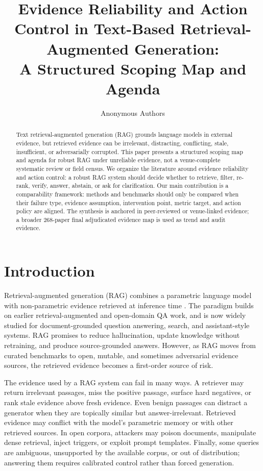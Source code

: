 \documentclass[11pt]{article}
\title{Evidence Reliability and Action Control in Text-Based Retrieval-Augmented Generation:\\
A Structured Scoping Map and Agenda}
\author{Anonymous Authors}
\date{}
\begin{document}
\maketitle

\begin{abstract}
Text retrieval-augmented generation (RAG) grounds language models in external evidence, but retrieved evidence can be irrelevant, distracting, conflicting, stale, insufficient, or adversarially corrupted. This paper presents a structured scoping map and agenda for robust RAG under unreliable evidence, not a venue-complete systematic review or field census. We organize the literature around evidence reliability and action control: a robust RAG system should decide whether to retrieve, filter, re-rank, verify, answer, abstain, or ask for clarification. Our main contribution is a comparability framework: methods and benchmarks should only be compared when their failure type, evidence assumption, intervention point, metric target, and action policy are aligned. The synthesis is anchored in peer-reviewed or venue-linked evidence; a broader 268-paper final adjudicated evidence map is used as trend and audit evidence.
\end{abstract}

\section{Introduction}

Retrieval-augmented generation (RAG) combines a parametric language model with non-parametric evidence retrieved at inference time \citep{lewis2020rag}. The paradigm builds on earlier retrieval-augmented and open-domain QA work, and is now widely studied for document-grounded question answering, search, and assistant-style systems. RAG promises to reduce hallucination, update knowledge without retraining, and produce source-grounded answers. However, as RAG moves from curated benchmarks to open, mutable, and sometimes adversarial evidence sources, the retrieved evidence becomes a first-order source of risk.

The evidence used by a RAG system can fail in many ways. A retriever may return irrelevant passages, miss the positive passage, surface hard negatives, or rank stale evidence above fresh evidence. Even benign passages can distract a generator when they are topically similar but answer-irrelevant. Retrieved evidence may conflict with the model's parametric memory or with other retrieved sources. In open corpora, attackers may poison documents, manipulate dense retrieval, inject triggers, or exploit prompt templates. Finally, some queries are ambiguous, unsupported by the available corpus, or out of distribution; answering them requires calibrated control rather than forced generation.
\end{document}
